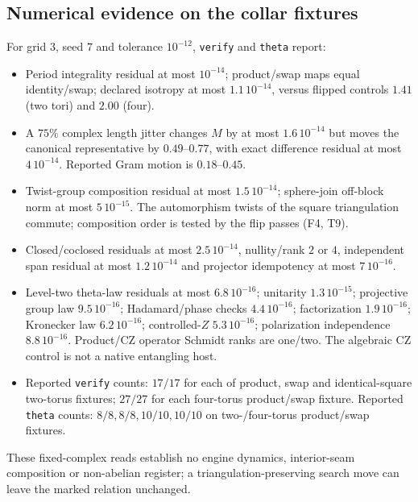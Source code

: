 \documentclass[11pt]{article}
\theoremstyle{definition}
\theoremstyle{remark}
\begin{document}
\subsection{Numerical evidence on the collar fixtures}
For grid $3$, seed $7$ and tolerance $10^{-12}$, \texttt{verify} and
\texttt{theta} report:
\begin{itemize}
\item Period integrality residual at most $10^{-14}$; product/swap maps
equal identity/swap; declared isotropy at most $1.1\,10^{-14}$, versus
flipped controls $1.41$ (two tori) and $2.00$ (four).
\item A $75\%$ complex length jitter changes $M$ by at most $1.6\,10^{-14}$
but moves the canonical representative by $0.49$--$0.77$, with exact
difference residual at most $4\,10^{-14}$. Reported Gram motion is
$0.18$--$0.45$.
\item Twist-group composition residual at most $1.5\,10^{-14}$; sphere-join
off-block norm at most $5\,10^{-15}$. The automorphism twists of the
square triangulation commute; composition order is tested by the flip
passes (F4, T9).
\item Closed/coclosed residuals at most $2.5\,10^{-14}$, nullity/rank
$2$ or $4$, independent span residual at most $1.2\,10^{-14}$ and
projector idempotency at most $7\,10^{-16}$.
\item Level-two theta-law residuals at most $6.8\,10^{-16}$;
unitarity $1.3\,10^{-15}$; projective group law $9.5\,10^{-16}$;
Hadamard/phase checks $4.4\,10^{-16}$; factorization $1.9\,10^{-16}$;
Kronecker law $6.2\,10^{-16}$; controlled-$Z$ $5.3\,10^{-16}$;
polarization independence $8.8\,10^{-16}$. Product/CZ operator Schmidt
ranks are one/two. The algebraic CZ control is not a native entangling host.
\item Reported \texttt{verify} counts: $17/17$ for each of product, swap
and identical-square two-torus fixtures; $27/27$ for each four-torus
product/swap fixture. Reported \texttt{theta} counts:
$8/8,8/8,10/10,10/10$ on two-/four-torus product/swap fixtures.
\end{itemize}
These fixed-complex reads establish no engine dynamics, interior-seam
composition or non-abelian register; a triangulation-preserving search
move can leave the marked relation unchanged.
\end{document}
